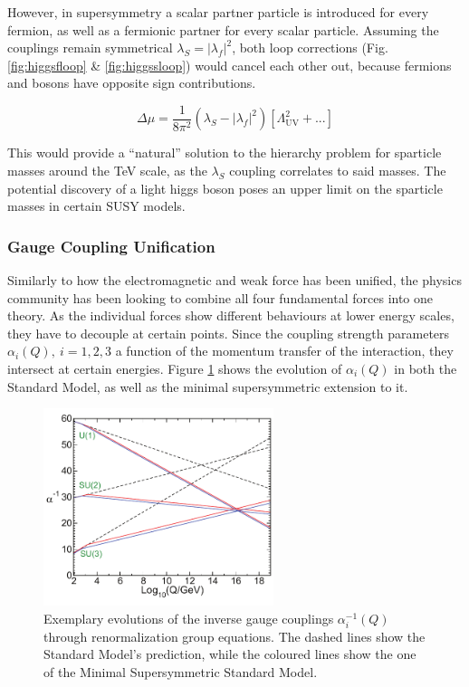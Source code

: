 However, in supersymmetry a scalar partner particle is introduced for every fermion, as well as a fermionic partner for every scalar particle. Assuming the couplings remain symmetrical $\lambda_S = |\lambda_f|^2$, both loop corrections (Fig. \ref{fig:higgsfloop} \& \ref{fig:higgssloop}) would cancel each other out, because fermions and bosons have opposite sign contributions.

\begin{equation}
  \label{eq:higgscancelcorr}
  \Delta \mu = \frac{1}{8 \pi^2} (\lambda_S - |\lambda_f|^2) \left[ \Lambda^2_{\text{UV}} + ... \right]
\end{equation}

\noindent This would provide a ``natural'' solution to the hierarchy problem for sparticle masses around the TeV scale, as the $\lambda_S$ coupling correlates to said masses. The potential discovery of a light higgs boson poses an upper limit on the sparticle masses in certain SUSY models. 


\subsubsection{Gauge Coupling Unification}

Similarly to how the electromagnetic and weak force has been unified, the physics community has been looking to combine all four fundamental forces into one theory. As the individual forces show different behaviours at lower energy scales, they have to decouple at certain points. Since the coupling strength parameters $\alpha_i(Q),\ i = 1, 2, 3$ a function of the momentum transfer of the interaction, they intersect at certain energies. Figure \ref{fig:coupq} shows the evolution of $\alpha_i(Q)$ in both the Standard Model, as well as the minimal supersymmetric extension to it. 

\begin{figure}[ht!]
  \centering
  \includegraphics[width=0.6\textwidth]{plots/coupq.pdf}
  \caption{Exemplary evolutions of the inverse gauge couplings $\alpha^{-1}_i(Q)$ through renormalization group equations. The dashed lines show the Standard Model's prediction, while the coloured lines show the one of the Minimal Supersymmetric Standard Model.}
  \label{fig:coupq}
\end{figure}

